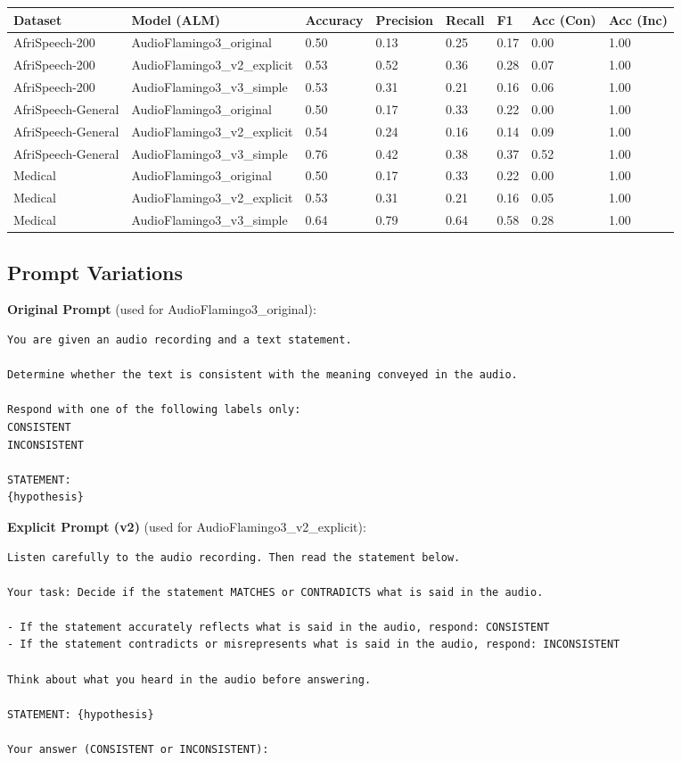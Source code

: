 \begin{tabular}{llllllll}
\toprule
Dataset & Model (ALM) & Accuracy & Precision & Recall & F1 & Acc (Con) & Acc (Inc) \\
\midrule
AfriSpeech-200 & AudioFlamingo3\_original & 0.50 & 0.13 & 0.25 & 0.17 & 0.00 & 1.00 \\
AfriSpeech-200 & AudioFlamingo3\_v2\_explicit & 0.53 & 0.52 & 0.36 & 0.28 & 0.07 & 1.00 \\
AfriSpeech-200 & AudioFlamingo3\_v3\_simple & 0.53 & 0.31 & 0.21 & 0.16 & 0.06 & 1.00 \\
AfriSpeech-General & AudioFlamingo3\_original & 0.50 & 0.17 & 0.33 & 0.22 & 0.00 & 1.00 \\
AfriSpeech-General & AudioFlamingo3\_v2\_explicit & 0.54 & 0.24 & 0.16 & 0.14 & 0.09 & 1.00 \\
AfriSpeech-General & AudioFlamingo3\_v3\_simple & 0.76 & 0.42 & 0.38 & 0.37 & 0.52 & 1.00 \\
Medical & AudioFlamingo3\_original & 0.50 & 0.17 & 0.33 & 0.22 & 0.00 & 1.00 \\
Medical & AudioFlamingo3\_v2\_explicit & 0.53 & 0.31 & 0.21 & 0.16 & 0.05 & 1.00 \\
Medical & AudioFlamingo3\_v3\_simple & 0.64 & 0.79 & 0.64 & 0.58 & 0.28 & 1.00 \\
\bottomrule
\end{tabular}

\vspace{1em}
\subsection*{Prompt Variations}

\noindent \textbf{Original Prompt} (used for AudioFlamingo3\_original):
\begin{verbatim}
You are given an audio recording and a text statement.

Determine whether the text is consistent with the meaning conveyed in the audio.

Respond with one of the following labels only:
CONSISTENT
INCONSISTENT

STATEMENT:
{hypothesis}
\end{verbatim}

\noindent \textbf{Explicit Prompt (v2)} (used for AudioFlamingo3\_v2\_explicit):
\begin{verbatim}
Listen carefully to the audio recording. Then read the statement below.

Your task: Decide if the statement MATCHES or CONTRADICTS what is said in the audio.

- If the statement accurately reflects what is said in the audio, respond: CONSISTENT
- If the statement contradicts or misrepresents what is said in the audio, respond: INCONSISTENT

Think about what you heard in the audio before answering.

STATEMENT: {hypothesis}

Your answer (CONSISTENT or INCONSISTENT):
\end{verbatim}

